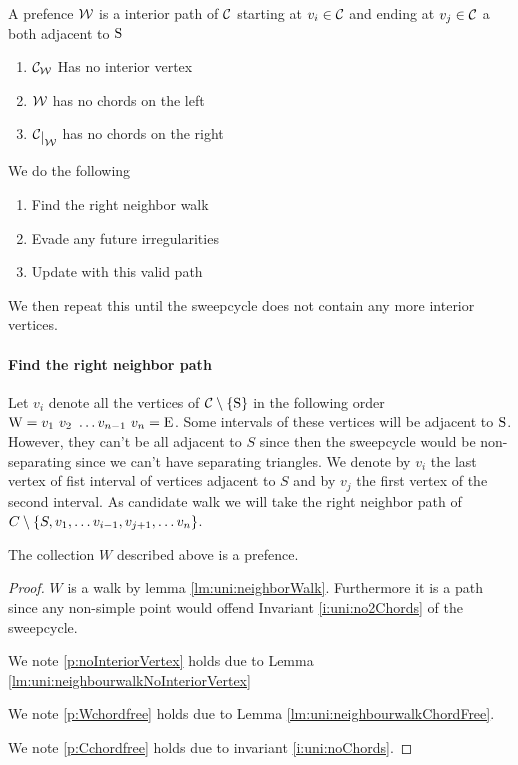   \begin{defi}[Prefence]
  A prefence $\mathcal{W}$ is a interior path of $\mathcal{C}$ starting at $v_i \in \mathcal{C}$ and ending at $v_j \in \mathcal{C}$ a both adjacent to $\mathrm{S}$
  \begin{enumerate}
   \renewcommand*{\labelenumi}{(P\arabic{enumi})}%
   \renewcommand*{\theenumi}{(P\arabic{enumi})}%
    \item  $\mathcal{C}_{\mathcal{W}}$ Has no interior vertex
    \label{p:noInteriorVertex}
    \item  $\mathcal{W}$ has no chords on the left     \label{p:Wchordfree}
    \item  $\restC{\W}$ has no chords on the right     \label{p:Cchordfree}
  \end{enumerate}
  \end{defi}

  We do the following
  \begin{enumerate}
    \item Find the right neighbor walk
    \item Evade any future irregularities
    \item Update with this valid path
  \end{enumerate}

  We then repeat this until the sweepcycle does not contain any more interior vertices.

  \paragraph{Find the right neighbor path}
    Let $v_i$ denote all the vertices of $\mathcal{C} \setminus \left\lbrace {\mathrm{S}} \right\rbrace$ in the following order $\mathrm{W} =  v_1 \  v_2 \  \ldots v_{n-1} \  v_n = \mathrm{E}$.
    Some intervals of these vertices will be adjacent to $\mathrm{S}$. However, they can't be all adjacent to $S$ since then the sweepcycle would be non-separating since we can't have separating triangles. We denote by $v_i$ the last vertex of fist interval of vertices adjacent to $S$ and by $v_j$ the first vertex of the second interval.
    As candidate walk we will take the right neighbor path of $C\setminus \left\lbrace {S, v_1, \ldots v_{i-1}, v_{j+1}, \dots v_n} \right\rbrace$.

    \begin{lemma}
      \label{lm:uni:isPrefence}
    The collection $W$ described above is a prefence.
    \end{lemma}
    \begin{proof}
    $W$ is a walk by lemma \ref{lm:uni:neighborWalk}. Furthermore it is a path since any non-simple point would offend Invariant \ref{i:uni:no2Chords} of the sweepcycle.


    We note \ref{p:noInteriorVertex} holds due to Lemma \ref{lm:uni:neighbourwalkNoInteriorVertex}

    We note \ref{p:Wchordfree} holds due to Lemma \ref{lm:uni:neighbourwalkChordFree}.

    We note \ref{p:Cchordfree} holds due to invariant \ref{i:uni:noChords}.
    \end{proof}

